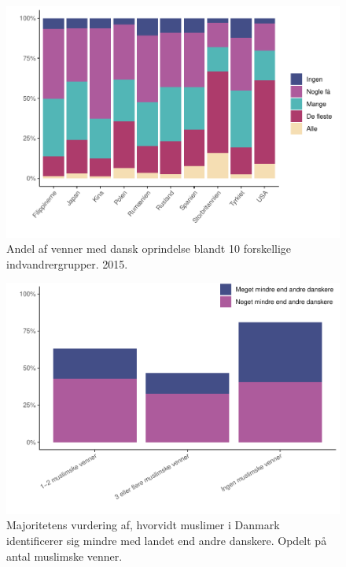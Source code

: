 \documentclass[
]{book}
\begin{document}
\begin{figure}
\includegraphics[width=1\linewidth]{en-befolkning-blander-sig_files/figure-latex/fig-6-4-1} \caption{Andel af venner med dansk oprindelse blandt 10 forskellige indvandrergrupper. 2015.}\label{fig:fig-6-4}
\end{figure}

\begin{figure}
\includegraphics[width=1\linewidth]{en-befolkning-blander-sig_files/figure-latex/fig-6-5-1} \caption{Majoritetens vurdering af, hvorvidt muslimer i Danmark identificerer sig mindre med landet end andre danskere. Opdelt på antal muslimske venner.}\label{fig:fig-6-5}
\end{figure}
\end{document}
